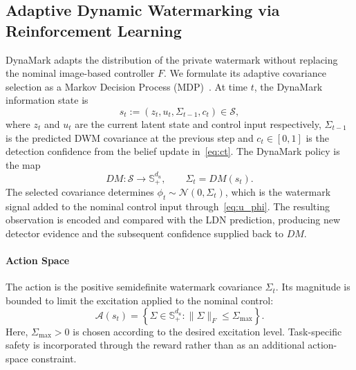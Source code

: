 \documentclass[letterpaper, 10 pt, conference]{ieeeconf}
\newcommand{\EditNA}[1]{{\color{purple} #1}}
\newcommand{\EditYW}[1]{{\color{red} #1}}
\theoremstyle{plain}
\begin{document}


\subsection{Adaptive Dynamic Watermarking via Reinforcement Learning}\label{subsec:dynamark_rl}
DynaMark adapts the distribution of the private watermark without
replacing the nominal image-based controller $F$. We formulate its
adaptive covariance selection as a Markov Decision Process
(MDP)~\cite{Puterman528623,sutton2018reinforcement}. At time $t$, the
DynaMark information state is
\begin{equation}\label{eq:dm_state}
    s_t
    :=
    (z_t,u_t,\Sigma_{t-1},c_t)\in\mathcal{S},
\end{equation}
where $z_t$ and $u_t$ are the current latent state and control input respectively, $\Sigma_{t-1}$ is the predicted DWM covariance at the previous step and  $c_t\in[0,1]$ is the detection confidence from the belief update in~\eqref{eq:ct}. The DynaMark policy is the map
\begin{equation}\label{eq:dm_interface}
    DM:\mathcal{S}\to\mathbb{S}_+^{d_u},
    \qquad
    \Sigma_t=DM(s_t).
\end{equation}
The selected covariance determines
$\phi_t\sim\mathcal{N}(0,\Sigma_t)$, which is the watermark signal added to the nominal control input through~\eqref{eq:u_phi}. The resulting observation is encoded and compared with the LDN prediction, producing new detector evidence
and the subsequent confidence supplied back to $DM$. 

\paragraph{Action Space}
The action is the positive semidefinite watermark covariance
$\Sigma_t$. Its magnitude is bounded to limit the excitation applied
to the nominal control:
\begin{equation}\label{eq:action_space}
    \mathcal{A}(s_t)
    =
    \left\{
        \Sigma \in \mathbb{S}_+^{d_u} :
        \|\Sigma\|_F \le \Sigma_{\max}
    \right\}.
\end{equation}
Here, $\Sigma_{\max}>0$ is chosen according to the desired excitation level. Task-specific safety is incorporated through the reward rather than as an additional action-space constraint.
\end{document}
